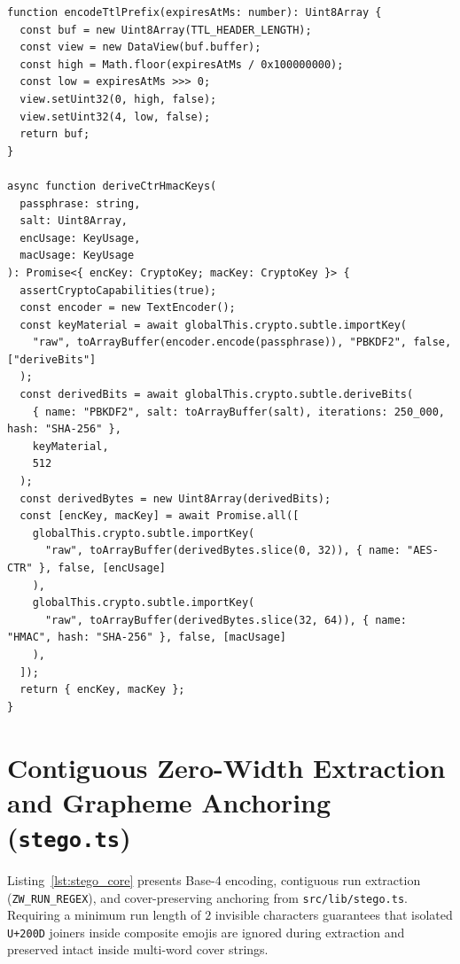 \documentclass[12pt,a4paper,oneside,openany]{report}
\begin{document}
\begin{lstlisting}[caption=Split 64-Bit TTL Serialization and 512-Bit PBKDF2 Key Splitting, label={lst:crypto_ttl}]
function encodeTtlPrefix(expiresAtMs: number): Uint8Array {
  const buf = new Uint8Array(TTL_HEADER_LENGTH);
  const view = new DataView(buf.buffer);
  const high = Math.floor(expiresAtMs / 0x100000000);
  const low = expiresAtMs >>> 0;
  view.setUint32(0, high, false);
  view.setUint32(4, low, false);
  return buf;
}

async function deriveCtrHmacKeys(
  passphrase: string,
  salt: Uint8Array,
  encUsage: KeyUsage,
  macUsage: KeyUsage
): Promise<{ encKey: CryptoKey; macKey: CryptoKey }> {
  assertCryptoCapabilities(true);
  const encoder = new TextEncoder();
  const keyMaterial = await globalThis.crypto.subtle.importKey(
    "raw", toArrayBuffer(encoder.encode(passphrase)), "PBKDF2", false, ["deriveBits"]
  );
  const derivedBits = await globalThis.crypto.subtle.deriveBits(
    { name: "PBKDF2", salt: toArrayBuffer(salt), iterations: 250_000, hash: "SHA-256" },
    keyMaterial,
    512
  );
  const derivedBytes = new Uint8Array(derivedBits);
  const [encKey, macKey] = await Promise.all([
    globalThis.crypto.subtle.importKey(
      "raw", toArrayBuffer(derivedBytes.slice(0, 32)), { name: "AES-CTR" }, false, [encUsage]
    ),
    globalThis.crypto.subtle.importKey(
      "raw", toArrayBuffer(derivedBytes.slice(32, 64)), { name: "HMAC", hash: "SHA-256" }, false, [macUsage]
    ),
  ]);
  return { encKey, macKey };
}
\end{lstlisting}

\section{Contiguous Zero-Width Extraction and Grapheme Anchoring (\texttt{stego.ts})}
Listing~\ref{lst:stego_core} presents Base-4 encoding, contiguous run extraction (\texttt{ZW\_RUN\_REGEX}), and cover-preserving anchoring from \texttt{src/lib/stego.ts}. Requiring a minimum run length of $2$ invisible characters guarantees that isolated \texttt{U+200D} joiners inside composite emojis are ignored during extraction and preserved intact inside multi-word cover strings.
\end{document}
